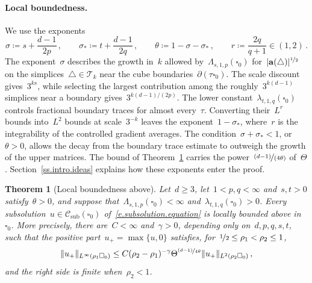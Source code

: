\documentclass[11pt,letterpaper]{article}
\numberwithin{equation}{section}
\newtheorem{theoremA}{Theorem}
\theoremstyle{definition}
\renewcommand{\a}{\mathbf{a}}
\newcommand{\nf}{\nicefrac}
\newcommand{\cu}{\square}
\DeclarePairedDelimiter{\norm}{\lVert}{\rVert}
\newcommand{\Csub}{\mathcal C_{\mathrm{sub}}}
\begin{document}
\paragraph{Local boundedness.} We use the exponents
\begin{equation}
	\sigma\coloneqq s+\frac{d-1}{2p}\,,\qquad \sigma_*\coloneqq t+\frac{d-1}{2q}\,,\qquad \theta\coloneqq1-\sigma-\sigma_*\,,\qquad r\coloneqq\frac{2q}{q+1}\in(1,2)\,.
	\label{e.intro.parameters}
\end{equation}
The exponent~$\sigma$ describes the growth in~$k$ allowed by~$\Lambda_{s,1,p}(\cu_0)$ for~$|\a(\triangle)|^{\nf12}$ on the simplices~$\triangle\in\mathscr T_k$ near the cube boundaries~$\partial(\tau\cu_0)$. The scale discount gives~$3^{ks}$, while selecting the largest contribution among the roughly~$3^{k(d-1)}$ simplices near a boundary gives~$3^{k(d-1)/(2p)}$. The lower constant~$\lambda_{t,1,q}(\cu_0)$ controls fractional boundary traces for almost every~$\tau$. Converting their~$L^r$ bounds into~$L^2$ bounds at scale~$3^{-k}$ leaves the exponent~$1-\sigma_*$, where~$r$ is the integrability of the controlled gradient averages. The condition~$\sigma+\sigma_*<1$, or~$\theta>0$, allows the decay from the boundary trace estimate to outweigh the growth of the upper matrices. The bound of Theorem~\ref{t.cg.local.boundedness} carries the power~$\nf{(d-1)}{(4\theta)}$ of~$\Theta$. Section~\ref{ss.intro.ideas} explains how these exponents enter the proof.

\begin{theoremA}[Local boundedness above]
\label{t.cg.local.boundedness}
Let~$d\geq3$, let~$1<p,q<\infty$ and~$s,t>0$ satisfy~$\theta>0$, and suppose that~$\Lambda_{s,1,p}(\cu_0)<\infty$ and~$\lambda_{t,1,q}(\cu_0)>0$. Every subsolution~$u\in\Csub(\cu_0)$ of~\eqref{e.subsolution.equation} is locally bounded above in~$\cu_0$. More precisely, there are~$C<\infty$ and~$\gamma>0$, depending only on~$d,p,q,s,t$, such that the positive part~$u_+=\max\{u,0\}$ satisfies, for~$\nf12\leq\rho_1<\rho_2\leq1$,
\begin{equation}
	\norm{u_+}_{L^\infty(\rho_1\cu_0)}\leq C(\rho_2-\rho_1)^{-\gamma}\Theta^{\nf{(d-1)}{4\theta}}\norm{u_+}_{L^2(\rho_2\cu_0)}\,,
	\label{e.cg.local.boundedness}
\end{equation}
and the right side is finite when~$\rho_2<1$.
\end{theoremA}
\end{document}
